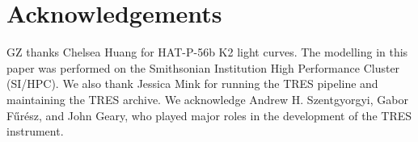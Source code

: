 \documentclass[useAMS,usenatbib]{mn2e}
\begin{document}
\section*{Acknowledgements}
\label{sec:acknowledgements}
GZ thanks Chelsea Huang for HAT-P-56b K2 light curves. The modelling in this paper was performed on the Smithsonian Institution High Performance Cluster (SI/HPC). We also thank Jessica Mink for running the TRES pipeline and maintaining the TRES archive. We acknowledge Andrew H. Szentgyorgyi, Gabor F\H{u}r\'{e}sz, and John Geary, who played major roles in the development of the TRES instrument. 










\label{lastpage}
\end{document}
